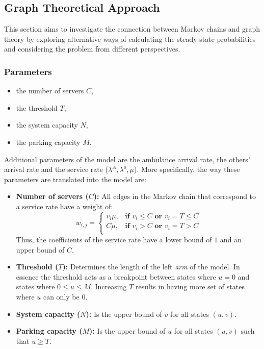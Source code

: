 \subsection{Graph Theoretical Approach}

This section aims to investigate the connection between Markov chains and graph theory by exploring alternative ways of calculating the steady state probabilities and considering the problem from different perspectives.

\subsubsection{Parameters}
\begin{itemize}
    \item the number of servers \(C\),
    \item the threshold \(T\), 
    \item the system capacity \(N\),
    \item the parking capacity \(M\). 
\end{itemize}
Additional parameters of the model are the ambulance arrival rate, the others' arrival rate and the service rate (\(\lambda^A, \lambda^o, \mu\)). 
More specifically, the way these parameters are translated into the model are:

\begin{itemize}
    \item \textbf{Number of servers (\(C\)):} All edges in the Markov chain that correspond to a service rate have a weight of: 
    \begin{equation*}
        w_{i, j} = 
        \begin{cases}
            v_i \mu, & \textbf{if } v_i \leq C \textbf{ or } v_i = T \leq C \\
            C \mu, & \textbf{if } v_i > C \textbf{ or } v_i = T > C\\
        \end{cases}
    \end{equation*}
    Thus, the coefficients of the service rate have a lower bound of \(1\) and an upper bound of \(C\).
    \item \textbf{Threshold (\(T\)):} Determines the length of the left \textit{arm} of the model. 
    In essence the threshold acts as a breakpoint between states where \(u=0\) and states where \(0 \leq u \leq M\). 
    Increasing \(T\) results in having more set of states where \(u\) can only be \(0\).
    \item \textbf{System capacity (\(N\)):} Is the upper bound of \(v\) for all states \((u,v)\).
    \item \textbf{Parking capacity (\(M\)):} Is the upper bound of \(u\) for all states \((u,v)\) such that \(u \geq T\).
\end{itemize}


